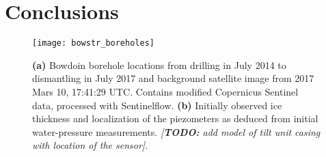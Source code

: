 \documentclass[utf8]{article}
\newcommand{\todo}[1]{\textcolor{c3}{\emph{[\textbf{TODO:} #1]}}}
\begin{document}

\section{Conclusions}






%
%



    \begin{figure}
      \centerline{\texttt{[image: bowstr\_boreholes]}}
      \caption{%
        \textbf{(a)}
          Bowdoin borehole locations from drilling in July 2014 to dismantling
          in July 2017 and background satellite image from 2017 Mars 10,
          17:41:29 UTC. Contains modified Copernicus Sentinel data, processed
          with Sentinelflow.
        \textbf{(b)}
          Initially observed ice thickness and localization of the piezometers
          as deduced from initial water-pressure measurements.
        \todo{add model of tilt unit casing with location of the sensor}.}
      \label{fig:boreholes}
    \end{figure}
\end{document}
